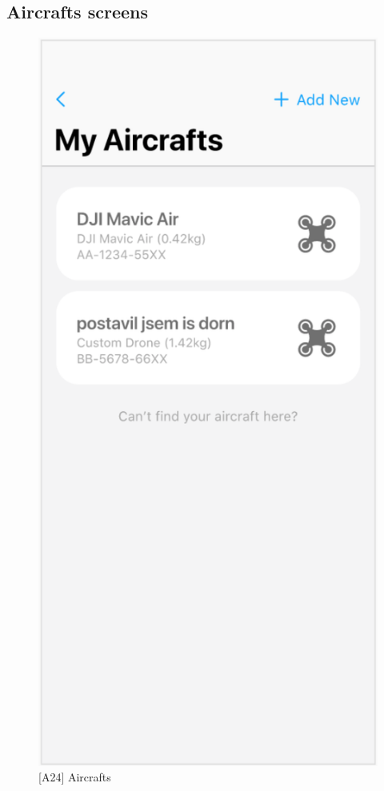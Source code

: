 \subsection{Aircrafts screens}\label{subsec:aircrafts-screens}


\begin{figure}
    \centering
    \begin{minipage}{.45\textwidth}
        \centering
        \includegraphics[width=.7\linewidth]{assets/user_interface_design/aircraft/aircrafts.png}
        \caption{[A24] Aircrafts}
        \label{fig:aircrafts}
    \end{minipage}%
    \hspace{.05\linewidth}
    \begin{minipage}{.45\textwidth}
        \centering

\end{minipage}
\end{figure}
